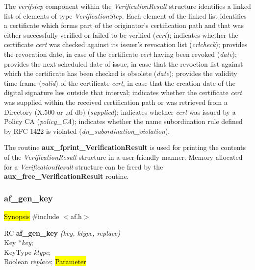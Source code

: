 The {\em verifstep} component within the {\em VerificationResult} structure identifies a 
linked list of elements of type {\em VerificationStep}.
Each element of the linked list
\bi
\m identifies a certificate which forms part of the originator's certification path and
that was either successfully verified or failed to be verified
({\em cert});
\m indicates whether the certificate {\em cert} was checked against its issuer's revocation 
list ({\em crlcheck});
\m provides the revocation date, in case of the certificate {\em cert} having been revoked
({\em date});
\m provides the next scheduled date of issue, in case that the revoction list against which the
certificate has been checked is obsolete ({\em date});
\m provides the validity time frame ({\em valid}) of the certificate {\em cert}, in case
that the creation date of the digital signature lies outside that interval;
\m indicates whether the certificate {\em cert} was supplied within the received certification
path or was retrieved from a Directory (X.500 or .af-db) ({\em supplied});
\m indicates whether {\em cert} was issued by a Policy CA ({\em policy\_CA});
\m indicates whether the name subordination rule defined by RFC 1422 is violated ({\em dn\_subordination\_violation}).
\ei

The routine {\bf aux\_fprint\_VerificationResult} is used for printing the contents of the
{\em VerificationResult} structure in a user-friendly manner. Memory allocated for
a {\em VerificationResult} structure can be freed by the {\bf aux\_free\_VerificationResult}
routine.

\subsubsection{af\_gen\_key}
\label{af_gen_key}
\hl{Synopsis}
\#include $<$af.h$>$

RC {\bf af\_gen\_key} {\em (key, ktype, replace)} \\
Key *{\em key}; \\
KeyType {\em ktype}; \\
Boolean {\em replace};
\hl{Parameter}



